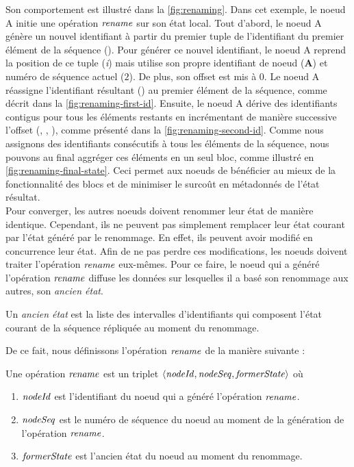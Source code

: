 Son comportement est illustré dans la \autoref{fig:renaming}.
Dans cet exemple, le noeud A initie une opération $\mathit{rename}$ sur son état local.
Tout d'abord, le noeud A génère un nouvel identifiant à partir du premier tuple de l'identifiant du premier élément de la séquence ().
Pour générer ce nouvel identifiant, le noeud A reprend la position de ce tuple (\emph{i}) mais utilise son propre identifiant de noeud (\textbf{A}) et numéro de séquence actuel ($2$).
De plus, son offset est mis à 0.
Le noeud A réassigne l'identifiant résultant () au premier élément de la séquence, comme décrit dans la \autoref{fig:renaming-first-id}.
Ensuite, le noeud A dérive des identifiants contigus pour tous les éléments restants en incrémentant de manière successive l'offset (, , ), comme présenté dans la \autoref{fig:renaming-second-id}.
Comme nous assignons des identifiants consécutifs à tous les éléments de la séquence, nous pouvons au final aggréger ces éléments en un seul bloc, comme illustré en \autoref{fig:renaming-final-state}.
Ceci permet aux noeuds de bénéficier au mieux de la fonctionnalité des blocs et de minimiser le surcoût en métadonnés de l'état résultat.\\

Pour converger, les autres noeuds doivent renommer leur état de manière identique.
Cependant, ils ne peuvent pas simplement remplacer leur état courant par l'état généré par le renommage.
En effet, ils peuvent avoir modifié en concurrence leur état.
Afin de ne pas perdre ces modifications, les noeuds doivent traiter l'opération $\mathit{rename}$ eux-mêmes.
Pour ce faire, le noeud qui a généré l'opération $\mathit{rename}$ diffuse les données sur lesquelles il a basé son renommage aux autres, \ie son \emph{ancien état}.

\begin{definition}
  \label{def:former-state}
  Un \emph{ancien état} est la liste des intervalles d'identifiants qui composent l'état courant de la séquence répliquée au moment du renommage.
\end{definition}

De ce fait, nous définissons l'opération $\mathit{rename}$ de la manière suivante :

\begin{definition}[rename]
  \label{def:rename-op}
  Une opération $\mathit{rename}$ est un triplet $\langle \mathit{nodeId}, \mathit{nodeSeq}, \mathit{formerState} \rangle$ où
  \begin{enumerate}
    \item $\mathit{nodeId}$ est l'identifiant du noeud qui a généré l'opération $\mathit{rename}$.
    \item $\mathit{nodeSeq}$ est le numéro de séquence du noeud au moment de la génération de l'opération $\mathit{rename}$.
    \item $\mathit{formerState}$ est l'ancien état du noeud au moment du renommage.
  \end{enumerate}
\end{definition}

